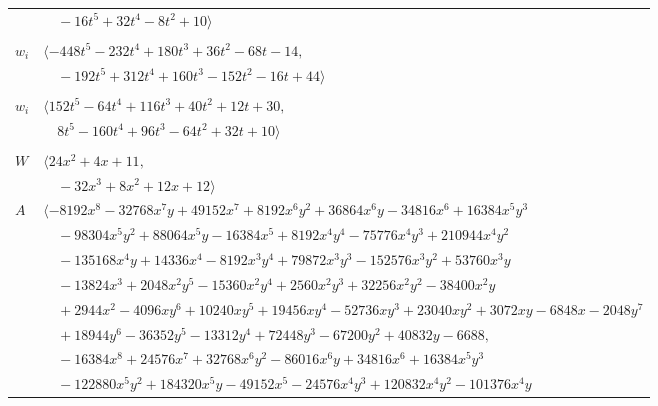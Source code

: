 \documentclass[11pt]{article}
\begin{document}
\begin{longtable}{@{}ll@{}}
 & $\quad -16t^{5}+32t^{4}-8t^{2}+10\rangle$\\
\addlinespace[2pt]
\multicolumn{2}{@{}p{0.97\textwidth}@{}}{$i=16$, $D_i=8$, $\rho_{ij}$: $2{:}1, \allowbreak 4{:}2, \allowbreak 7{:}2, \allowbreak 8{:}2, \allowbreak 24{:}2, \allowbreak 28{:}1, \allowbreak 30{:}2, \allowbreak 32{:}1, \allowbreak 34{:}2, \allowbreak 37{:}1, \allowbreak 50{:}1$}\\
$w_i$ & $\langle -448t^{5}-232t^{4}+180t^{3}+36t^{2}-68t-14,$\\
 & $\quad -192t^{5}+312t^{4}+160t^{3}-152t^{2}-16t+44\rangle$\\
\addlinespace[2pt]
\multicolumn{2}{@{}p{0.97\textwidth}@{}}{$i=17$, $D_i=4$, $\rho_{ij}$: $0{:}2, \allowbreak 2{:}1, \allowbreak 8{:}1, \allowbreak 18{:}2, \allowbreak 22{:}1, \allowbreak 33{:}2, \allowbreak 35{:}2, \allowbreak 40{:}1, \allowbreak 41{:}1, \allowbreak 46{:}1, \allowbreak 47{:}1, \allowbreak 48{:}2, \allowbreak 49{:}2$}\\
$w_i$ & $\langle 152t^{5}-64t^{4}+116t^{3}+40t^{2}+12t+30,$\\
 & $\quad 8t^{5}-160t^{4}+96t^{3}-64t^{2}+32t+10\rangle$\\
\addlinespace[2pt]
\multicolumn{2}{@{}p{0.97\textwidth}@{}}{$i=18$, $D_i=16$, $\rho_{ij}$: $4{:}1, \allowbreak 17{:}1, \allowbreak 22{:}2, \allowbreak 24{:}2, \allowbreak 29{:}1, \allowbreak 32{:}2, \allowbreak 41{:}2$}\\
$W$ & $\langle 24x^{2}+4x+11,$\\
 & $\quad -32x^{3}+8x^{2}+12x+12\rangle$\\
$A$ & $\langle -8192x^{8}-32768x^{7}y+49152x^{7}+8192x^{6}y^{2}+36864x^{6}y-34816x^{6}+16384x^{5}y^{3}$\\
 & $\quad -98304x^{5}y^{2}+88064x^{5}y-16384x^{5}+8192x^{4}y^{4}-75776x^{4}y^{3}+210944x^{4}y^{2}$\\
 & $\quad -135168x^{4}y+14336x^{4}-8192x^{3}y^{4}+79872x^{3}y^{3}-152576x^{3}y^{2}+53760x^{3}y$\\
 & $\quad -13824x^{3}+2048x^{2}y^{5}-15360x^{2}y^{4}+2560x^{2}y^{3}+32256x^{2}y^{2}-38400x^{2}y$\\
 & $\quad +2944x^{2}-4096xy^{6}+10240xy^{5}+19456xy^{4}-52736xy^{3}+23040xy^{2}+3072xy-6848x-2048y^{7}$\\
 & $\quad +18944y^{6}-36352y^{5}-13312y^{4}+72448y^{3}-67200y^{2}+40832y-6688,$\\
 & $\quad -16384x^{8}+24576x^{7}+32768x^{6}y^{2}-86016x^{6}y+34816x^{6}+16384x^{5}y^{3}$\\
 & $\quad -122880x^{5}y^{2}+184320x^{5}y-49152x^{5}-24576x^{4}y^{3}+120832x^{4}y^{2}-101376x^{4}y$\\

\end{longtable}
\end{document}
